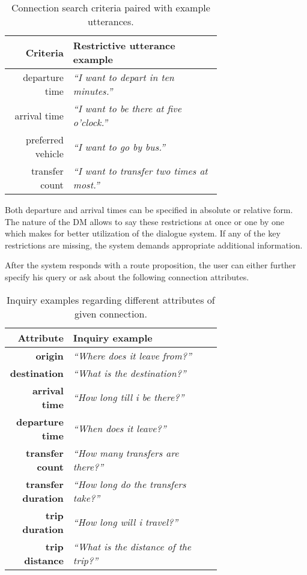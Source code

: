 \begin{table}[h]
\centering
\begin{tabular}{ r | p{0.7\linewidth} }
	Criteria & Restrictive utterance example \\ \hline
	departure time & \textit{``I want to depart in ten minutes.''} \\
	arrival time & \textit{``I want to be there at five o'clock.''} \\
	preferred vehicle & \textit{``I want to go by bus.''} \\
	transfer count & \textit{``I want to transfer two times at most.''}
\end{tabular}
\caption[Restrictive criteria specification]{Connection search criteria paired with example utterances.}
\label{table:attributes}
\end{table}

Both departure and arrival times can be specified in absolute or relative form.
The nature of the DM allows to say these restrictions at once or one by one which makes for better utilization of the dialogue system.
If any of the key restrictions are missing, the system demands appropriate additional information.

After the system responds with a route proposition, the user can either further specify his query or ask about the following connection attributes.

\begin{table}[h]
\centering
\begin{tabular}{ r | p{0.7\linewidth} }
	Attribute & Inquiry example \\ \hline
	\textbf{origin} & \textit{``Where does it leave from?''} \\
	\textbf{destination} & \textit{``What is the destination?''} \\
	\textbf{arrival time} & \textit{``How long till i be there?''} \\
	\textbf{departure time} & \textit{``When does it leave?''} \\
	\textbf{transfer count} & \textit{``How many transfers are there?''} \\
	\textbf{transfer duration} & \textit{``How long do the transfers take?''} \\
	\textbf{trip duration} & \textit{``How long will i travel?''} \\
	\textbf{trip distance} & \textit{``What is the distance of the trip?''}
\end{tabular}
\caption[Details about provided connection]{Inquiry examples regarding different attributes of given connection.}
\label{table:attributes}
\end{table}

